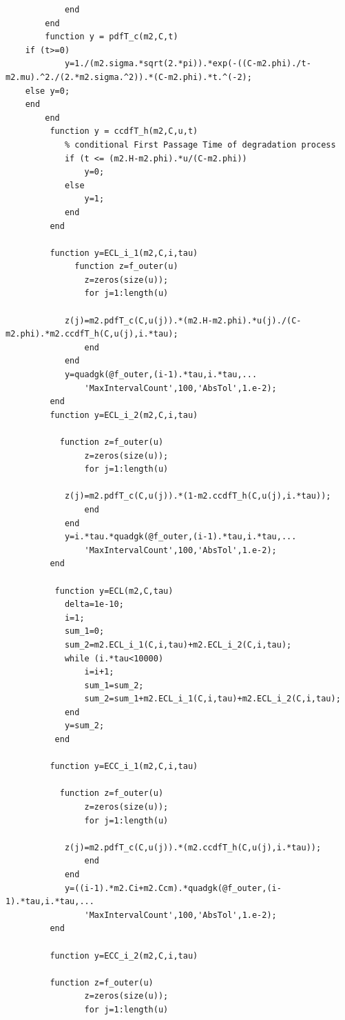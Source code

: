 \documentclass[10pt,a4paper]{article}
\theoremstyle{remark}
\begin{document}
\begin{appendices}
\begin{verbatim}
            end
        end
        function y = pdfT_c(m2,C,t)
    if (t>=0)
            y=1./(m2.sigma.*sqrt(2.*pi)).*exp(-((C-m2.phi)./t-m2.mu).^2./(2.*m2.sigma.^2)).*(C-m2.phi).*t.^(-2);
    else y=0;
    end
        end
         function y = ccdfT_h(m2,C,u,t)
            % conditional First Passage Time of degradation process
            if (t <= (m2.H-m2.phi).*u/(C-m2.phi))
                y=0;
            else
                y=1;
            end
         end

         function y=ECL_i_1(m2,C,i,tau)
              function z=f_outer(u)
                z=zeros(size(u));
                for j=1:length(u)

            z(j)=m2.pdfT_c(C,u(j)).*(m2.H-m2.phi).*u(j)./(C-m2.phi).*m2.ccdfT_h(C,u(j),i.*tau);
                end
            end
            y=quadgk(@f_outer,(i-1).*tau,i.*tau,...
                'MaxIntervalCount',100,'AbsTol',1.e-2);
         end
         function y=ECL_i_2(m2,C,i,tau)
   
           function z=f_outer(u)
                z=zeros(size(u));
                for j=1:length(u)
                    
            z(j)=m2.pdfT_c(C,u(j)).*(1-m2.ccdfT_h(C,u(j),i.*tau));
                end
            end
            y=i.*tau.*quadgk(@f_outer,(i-1).*tau,i.*tau,...
                'MaxIntervalCount',100,'AbsTol',1.e-2);
         end
         
          function y=ECL(m2,C,tau)
            delta=1e-10;
            i=1;
            sum_1=0;
            sum_2=m2.ECL_i_1(C,i,tau)+m2.ECL_i_2(C,i,tau);
            while (i.*tau<10000) 
                i=i+1;
                sum_1=sum_2;
                sum_2=sum_1+m2.ECL_i_1(C,i,tau)+m2.ECL_i_2(C,i,tau);
            end
            y=sum_2;
          end
        
         function y=ECC_i_1(m2,C,i,tau)
          
           function z=f_outer(u)
                z=zeros(size(u));
                for j=1:length(u)
                    
            z(j)=m2.pdfT_c(C,u(j)).*(m2.ccdfT_h(C,u(j),i.*tau));
                end
            end
            y=((i-1).*m2.Ci+m2.Ccm).*quadgk(@f_outer,(i-1).*tau,i.*tau,...
                'MaxIntervalCount',100,'AbsTol',1.e-2);
         end
         
         function y=ECC_i_2(m2,C,i,tau)
          
         function z=f_outer(u)
                z=zeros(size(u));
                for j=1:length(u)
                    

\end{verbatim}
\end{appendices}
\end{document}
